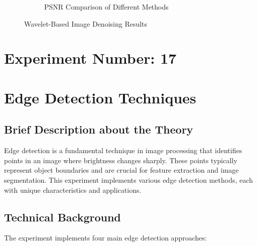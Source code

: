 \documentclass[12pt,a4paper]{article}
\begin{document}
\begin{figure}[H]
\begin{subfigure}[b]{0.48\textwidth}
    \caption{PSNR Comparison of Different Methods}
  \end{subfigure}
  \caption{Wavelet-Based Image Denoising Results}
  \label{fig:wavelet_denoising}
\end{figure}

\newpage
\section*{Experiment Number: 17}
\section{Edge Detection Techniques}

\subsection{Brief Description about the Theory}
Edge detection is a fundamental technique in image processing that identifies points in an image where brightness changes sharply. These points typically represent object boundaries and are crucial for feature extraction and image segmentation. This experiment implements various edge detection methods, each with unique characteristics and applications.

\subsection{Technical Background}
The experiment implements four main edge detection approaches:
\end{document}
